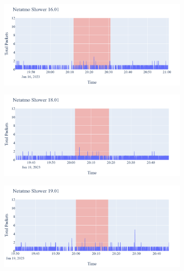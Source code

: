 \begin{figure}[H]
    \begin{subfigure}[b]{0.47\textwidth}
        \centering
        \includegraphics[width=1.2\hsize]{figures/Netatmo_Shower_Packets_16.01.png}
    \end{subfigure}
    \begin{subfigure}[b]{0.47\textwidth}
        \centering
        \includegraphics[width=1.2\hsize]{figures/Netatmo_Shower_Packets_18.01.png}
    \end{subfigure}
    \begin{subfigure}[b]{0.47\textwidth}
        \centering
        \includegraphics[width=1.2\hsize]{figures/Netatmo_Shower_Packets_19.01.png}
    \end{subfigure}
    \begin{subfigure}[b]{0.47\textwidth}

\end{subfigure}
\end{figure}
